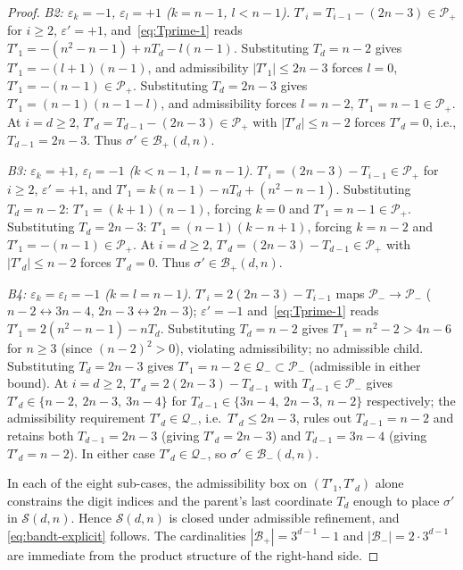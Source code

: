\documentclass{amsart}
\theoremstyle{definition}
\theoremstyle{remark}
\begin{document}
\begin{proof}
\emph{B2: $\varepsilon_k = -1$, $\varepsilon_l = +1$ ($k = n-1$,
$l < n-1$).}
$T'_i = T_{i-1} - (2n-3) \in \mathcal{P}_+$ for $i \ge 2$,
$\varepsilon' = +1$, and~\eqref{eq:Tprime-1} reads
$T'_1 = -(n^2 - n - 1) + n T_d - l(n-1)$.
Substituting $T_d = n-2$ gives $T'_1 = -(l+1)(n-1)$, and admissibility
$|T'_1| \le 2n-3$ forces $l = 0$, $T'_1 = -(n-1) \in \mathcal{P}_+$.
Substituting $T_d = 2n-3$ gives $T'_1 = (n-1)(n - 1 - l)$, and
admissibility forces $l = n-2$, $T'_1 = n-1 \in \mathcal{P}_+$.
At $i = d \ge 2$, $T'_d = T_{d-1} - (2n-3) \in \mathcal{P}_+$ with
$|T'_d| \le n-2$ forces $T'_d = 0$, i.e., $T_{d-1} = 2n-3$.
Thus $\sigma' \in \mathcal{B}_+(d, n)$.

\emph{B3: $\varepsilon_k = +1$, $\varepsilon_l = -1$ ($k < n-1$,
$l = n-1$).}
$T'_i = (2n-3) - T_{i-1} \in \mathcal{P}_+$ for $i \ge 2$,
$\varepsilon' = +1$, and $T'_1 = k(n-1) - n T_d + (n^2 - n - 1)$.
Substituting $T_d = n-2$: $T'_1 = (k+1)(n-1)$, forcing $k = 0$ and
$T'_1 = n-1 \in \mathcal{P}_+$.
Substituting $T_d = 2n-3$: $T'_1 = (n-1)(k - n + 1)$, forcing $k = n-2$
and $T'_1 = -(n-1) \in \mathcal{P}_+$.
At $i = d \ge 2$, $T'_d = (2n-3) - T_{d-1} \in \mathcal{P}_+$ with
$|T'_d| \le n-2$ forces $T'_d = 0$.  Thus $\sigma' \in \mathcal{B}_+(d, n)$.

\emph{B4: $\varepsilon_k = \varepsilon_l = -1$ ($k = l = n-1$).}
$T'_i = 2(2n-3) - T_{i-1}$ maps $\mathcal{P}_- \to \mathcal{P}_-$
($n-2 \leftrightarrow 3n-4$, $2n-3 \leftrightarrow 2n-3$);
$\varepsilon' = -1$ and~\eqref{eq:Tprime-1} reads
$T'_1 = 2(n^2 - n - 1) - n T_d$.
Substituting $T_d = n-2$ gives $T'_1 = n^2 - 2 > 4n - 6$ for $n \ge 3$
(since $(n - 2)^2 > 0$), violating admissibility; no admissible child.
Substituting $T_d = 2n-3$ gives $T'_1 = n - 2 \in \mathcal{Q}_-
\subset \mathcal{P}_-$ (admissible in either bound).
At $i = d \ge 2$, $T'_d = 2(2n-3) - T_{d-1}$ with $T_{d-1} \in
\mathcal{P}_-$ gives $T'_d \in \{n-2,\ 2n-3,\ 3n-4\}$ for
$T_{d-1} \in \{3n-4,\ 2n-3,\ n-2\}$ respectively; the admissibility
requirement $T'_d \in \mathcal{Q}_-$, i.e.\ $T'_d \le 2n-3$, rules
out $T_{d-1} = n - 2$ and retains both $T_{d-1} = 2n - 3$
(giving $T'_d = 2n - 3$) and $T_{d-1} = 3n - 4$ (giving $T'_d =
n - 2$).  In either case $T'_d \in \mathcal{Q}_-$, so
$\sigma' \in \mathcal{B}_-(d, n)$.

\smallskip
In each of the eight sub-cases, the admissibility box on
$(T'_1, T'_d)$ alone constrains the digit indices and the parent's
last coordinate $T_d$ enough to place $\sigma'$ in $\mathcal{S}(d, n)$.
Hence $\mathcal{S}(d, n)$ is closed under admissible refinement, and
\eqref{eq:bandt-explicit} follows.
The cardinalities $|\mathcal{B}_+| = 3^{d-1} - 1$ and
$|\mathcal{B}_-| = 2 \cdot 3^{d-1}$ are immediate from the product
structure of the right-hand side.
\end{proof}
\end{document}
